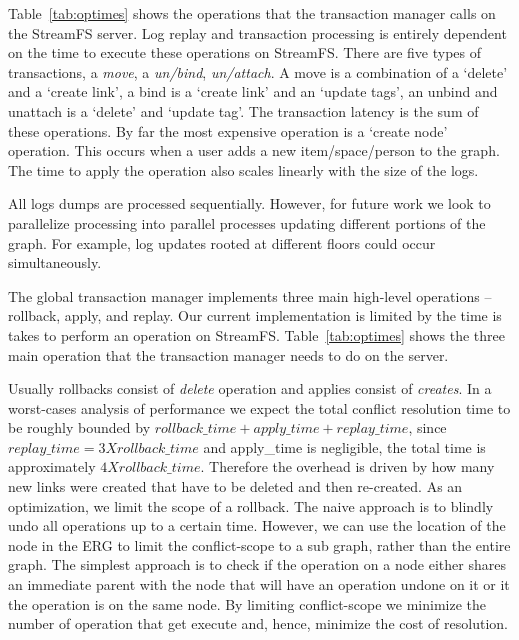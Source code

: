Table~\ref{tab:optimes} shows the  operations that the transaction manager calls on the StreamFS server.
Log replay and transaction processing is entirely dependent on the time to execute these operations on StreamFS.
There are five types of transactions, a \emph{move}, a \emph{un/bind}, \emph{un/attach}.  A move is a combination
of a `delete' and a `create link', a bind is a `create link' and an `update tags', an unbind and unattach is a
`delete' and `update tag'.  The transaction latency is the sum of these operations.  By far the most expensive
operation is a `create node' operation.  This occurs when a user adds a new item/space/person to the graph.
The time to apply the operation also scales linearly with the size of the logs.  

All logs dumps are processed sequentially.  However, for future work we look to parallelize processing into
parallel processes updating different portions of the graph.  For example, log updates rooted at different floors
could occur simultaneously.

The global transaction manager implements three main high-level operations -- rollback, apply, and replay.  Our current implementation
is limited by the time is takes to perform an operation on StreamFS.  Table~\ref{tab:optimes} shows the three 
main operation that the transaction manager needs to do on the server.

Usually rollbacks consist of \emph{delete} operation and applies consist of \emph{creates}.  In a worst-cases analysis
of performance we expect the total conflict resolution time to be roughly bounded by
$rollback\_time + apply\_time + replay\_time$, since $replay\_time=3 X rollback\_time$ and apply\_time is negligible, 
the total time is approximately $4 X rollback\_time$.  Therefore the overhead is driven by how many new links were created
that have to be deleted and then re-created.  As an optimization, we limit the scope of a rollback.  The naive
approach is to blindly undo all operations up to a certain time.  However, we can use the location of the node
in the ERG to limit the conflict-scope to a sub graph, rather than the entire graph.  The simplest approach is to check if the operation
on a node either shares an immediate parent with the node that will have an operation undone on it or it the operation
is on the same node.  By limiting conflict-scope we minimize the number of operation that get execute and, hence, minimize the 
cost of resolution.



